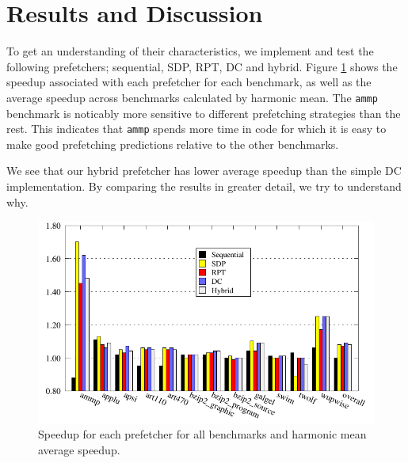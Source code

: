 \section{Results and Discussion}
\label{sec:results-and-discussion}

To get an understanding of their characteristics, we implement and
test the following prefetchers; sequential, SDP, RPT, DC and hybrid.
Figure \ref{fig:comparison} shows the speedup associated with each
prefetcher for each benchmark, as well as the average speedup across
benchmarks calculated by harmonic mean. The \texttt{ammp} benchmark is
noticably more sensitive to different prefetching strategies than the
rest. This indicates that \texttt{ammp} spends more time in code for
which it is easy to make good prefetching predictions relative to the
other benchmarks.

We see that our hybrid prefetcher has lower average speedup than the
simple DC implementation.  By comparing the results in greater detail,
we try to understand why.

\begin{figure}
  \centering
  \includegraphics{plots/overview_speedup.pdf}
  \caption{Speedup for each prefetcher for all benchmarks and harmonic mean average speedup.}
  \label{fig:comparison}
\end{figure}


